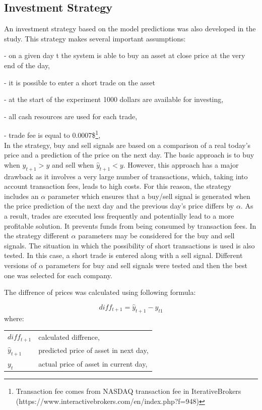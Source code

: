 \documentclass[review]{elsarticle} %
\makeatletter
\newenvironment{conditions}
{\par\vspace{\abovedisplayskip}\noindent\begin{tabular}{>{$}l<{$} @{${}={}$} l}}
       {\end{tabular}\par\vspace{\belowdisplayskip}}
\makeatother
\begin{document}
\subsection{Investment Strategy}

An investment strategy based on the model predictions was also developed in the study. This strategy makes several important assumptions:
 
\noindent- on a given day t the system is able to buy an asset at close price at the very end of the day,

\noindent- it is possible to enter a short trade on the asset

\noindent- at the start of the experiment 1000 dollars are available for investing,  

\noindent- all cash resources are used for each trade, 

\noindent- trade fee is equal to 0.0007\$\footnote{Transaction fee comes from NASDAQ transaction fee in IterativeBrokers (https://www.interactivebrokers.com/en/index.php?f=948)}, \\

In the strategy, buy and sell signals are based on a comparison of a real today's price and a prediction of the price on the next day. The basic approach is to buy when $\hat{y}_{t+1} > y$ and sell when $\hat{y}_{t+1} < y$. However, this approach has a major drawback as it involves a very large number of transactions, which, taking into account transaction fees, leads to high costs. For this reason, the strategy includes an $\alpha$ parameter which ensures that a buy/sell signal is generated when the price prediction of the next day and the previous day's price differs by $\alpha$. As a result, trades are executed less frequently and potentially lead to a more profitable solution. It prevents funds from being consumed by transaction fees. In the strategy different $\alpha$ parameters may be considered for the buy and sell signals. The situation in which the possibility of short transactions is used is also tested. In this case, a short trade is entered along with a sell signal. 
Different versions of $\alpha$ parameters for buy and sell signals were tested and then the best one was selected for each company.

\pagebreak
The diffrence of prices was calculated using following formula:

\begin{equation}  diff_{t+1} = \hat{y}_{t+1} - y_{t1} \end{equation}
where:
\begin{conditions}
diff_{t+1} & calculated diffrence, \\ 
 \hat{y}_{t+1}     &   predicted price of asset in next day,\\
 y_{t}     &  actual price of asset in current day,\\   
\end{conditions}
\end{document}
